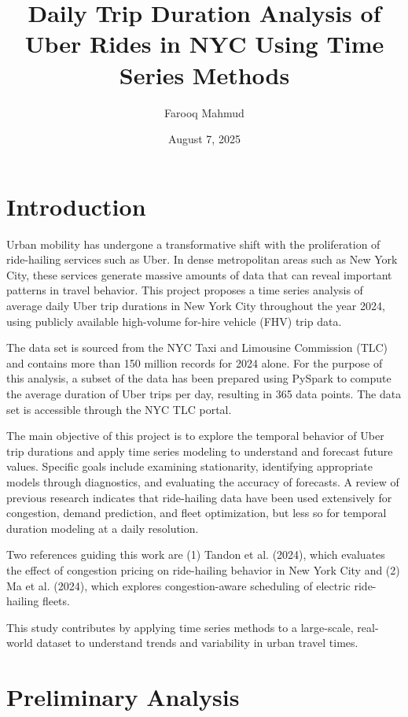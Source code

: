 \documentclass{article}
\title{Daily Trip Duration Analysis of Uber Rides in NYC Using Time Series Methods }
\author{
    Farooq Mahmud
}
\date{August 7, 2025}
\begin{document}
\maketitle

\section{Introduction}
Urban mobility has undergone a transformative shift with the proliferation of ride-hailing services such as Uber. In dense metropolitan areas such as New York City, these services generate massive amounts of data that can reveal important patterns in travel behavior. This project proposes a time series analysis of average daily Uber trip durations in New York City throughout the year 2024, using publicly available high-volume for-hire vehicle (FHV) trip data.

The data set is sourced from the NYC Taxi and Limousine Commission (TLC) and contains more than 150 million records for 2024 alone. For the purpose of this analysis, a subset of the data has been prepared using PySpark to compute the average duration of Uber trips per day, resulting in 365 data points. The data set is accessible through the NYC TLC portal\cite{nyctlc2024}.

The main objective of this project is to explore the temporal behavior of Uber trip durations and apply time series modeling to understand and forecast future values. Specific goals include examining stationarity, identifying appropriate models through diagnostics, and evaluating the accuracy of forecasts. A review of previous research indicates that ride-hailing data have been used extensively for congestion, demand prediction, and fleet optimization, but less so for temporal duration modeling at a daily resolution.

Two references guiding this work are (1) Tandon et al. (2024), which evaluates the effect of congestion pricing on ride-hailing behavior in New York City\cite{tandon2024congestion} and (2) Ma et al. (2024), which explores congestion-aware scheduling of electric ride-hailing fleets\cite{ma2024congestion}.

This study contributes by applying time series methods to a large-scale, real-world dataset to understand trends and variability in urban travel times.

\section{Preliminary Analysis}
\end{document}
